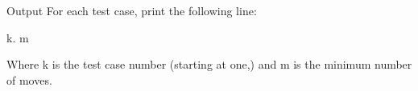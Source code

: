 Output
For each test case, print the following line:


k. m


Where k is the test case number (starting at one,) and m is the minimum number of moves.
